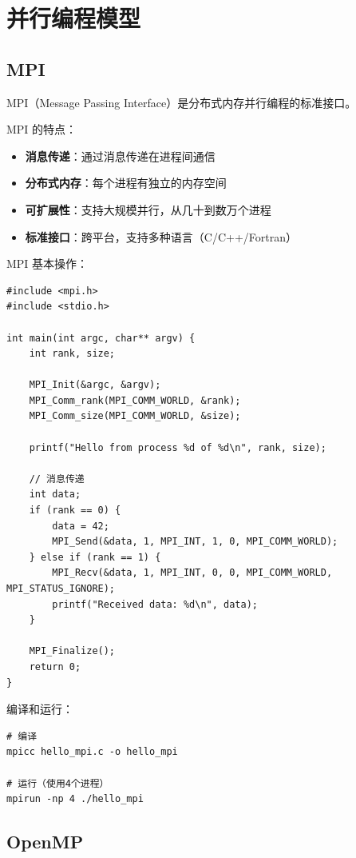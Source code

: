\documentclass[12pt,UTF8]{ctexbook}
\begin{document}
\chapter{并行编程模型}
\label{chap:parallel_programming}

\section{MPI}
\label{sec:mpi}

MPI（Message Passing Interface）是分布式内存并行编程的标准接口。

MPI 的特点：
\begin{itemize}
    \item \textbf{消息传递}：通过消息传递在进程间通信
    \item \textbf{分布式内存}：每个进程有独立的内存空间
    \item \textbf{可扩展性}：支持大规模并行，从几十到数万个进程
    \item \textbf{标准接口}：跨平台，支持多种语言（C/C++/Fortran）
\end{itemize}

MPI 基本操作：
\begin{verbatim}
#include <mpi.h>
#include <stdio.h>

int main(int argc, char** argv) {
    int rank, size;
    
    MPI_Init(&argc, &argv);
    MPI_Comm_rank(MPI_COMM_WORLD, &rank);
    MPI_Comm_size(MPI_COMM_WORLD, &size);
    
    printf("Hello from process %d of %d\n", rank, size);
    
    // 消息传递
    int data;
    if (rank == 0) {
        data = 42;
        MPI_Send(&data, 1, MPI_INT, 1, 0, MPI_COMM_WORLD);
    } else if (rank == 1) {
        MPI_Recv(&data, 1, MPI_INT, 0, 0, MPI_COMM_WORLD, MPI_STATUS_IGNORE);
        printf("Received data: %d\n", data);
    }
    
    MPI_Finalize();
    return 0;
}
\end{verbatim}

编译和运行：
\begin{verbatim}
# 编译
mpicc hello_mpi.c -o hello_mpi

# 运行（使用4个进程）
mpirun -np 4 ./hello_mpi
\end{verbatim}

\section{OpenMP}
\label{sec:openmp}
\end{document}
